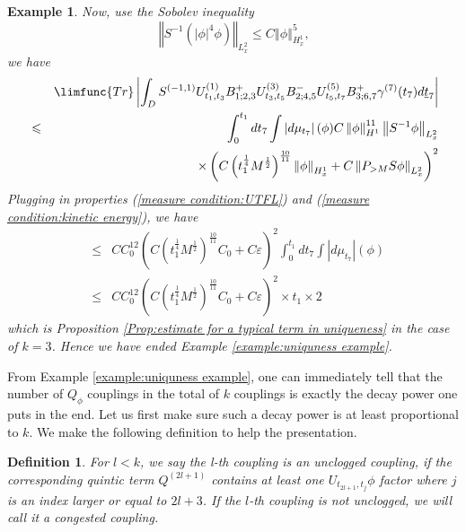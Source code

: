 \documentclass[12pt,letterpaper,leqno]{amsart}
\theoremstyle{plain}
\newtheorem{definition}{Definition}
\newtheorem{example}{Example}
\numberwithin{equation}{section}
\numberwithin{theorem}{section}
\numberwithin{proposition}{section}
\numberwithin{lemma}{section}
\numberwithin{corollary}{section}
\begin{document}
\begin{example}
Now, use the Sobolev inequality%
\begin{equation}
\left\Vert S^{-1}\left( \left\vert \phi \right\vert ^{4}\phi \right)
\right\Vert _{L_{x}^{2}}\leqslant C\left\Vert \phi \right\Vert
_{H_{x}^{1}}^{5}\text{,}  \label{eqn:sobolev for naked term}
\end{equation}%
we have%
\begin{eqnarray*}
&&\limfunc{Tr}\left\vert
\int_{D}S^{(-1,1)}U_{t_{1},t_{3}}^{(1)}B_{1;2,3}^{+}U_{t_{3},t_{5}}^{(3)}B_{2;4,5}^{-}U_{t_{5},t_{7}}^{(5)}B_{3;6,7}^{+}\gamma ^{(7)}(t_{7})d%
\underline{t}_{7}\right\vert \\
&\leqslant &\int_{0}^{t_{1}}dt_{7}\int \left\vert d\mu _{t_{7}}\right\vert
(\phi )C\left\Vert \phi \right\Vert _{H^{1}}^{11}\left\Vert S^{-1}\phi
\right\Vert _{L_{x}^{2}} \\
&&\times \left( C\left( t_{1}^{\frac{1}{4}}M^{\frac{1}{2}}\right) ^{\frac{10%
}{11}}\left\Vert \phi \right\Vert _{H_{x}^{1}}+C\left\Vert P_{>M}S\phi
\right\Vert _{L_{x}^{2}}\right) ^{2}
\end{eqnarray*}%
Plugging in properties (\ref{measure condition:UTFL}) and (\ref{measure
condition:kinetic energy}), we have%
\begin{eqnarray*}
&\leqslant &CC_{0}^{12}\left( C\left( t_{1}^{\frac{1}{4}}M^{\frac{1}{2}%
}\right) ^{\frac{10}{11}}C_{0}+C\varepsilon \right)
^{2}\int_{0}^{t_{1}}dt_{7}\int \left\vert d\mu _{t_{7}}\right\vert (\phi ) \\
&\leqslant &CC_{0}^{12}\left( C\left( t_{1}^{\frac{1}{4}}M^{\frac{1}{2}%
}\right) ^{\frac{10}{11}}C_{0}+C\varepsilon \right) ^{2}\times t_{1}\times 2
\end{eqnarray*}%
which is Proposition \ref{Prop:estimate for a typical term in uniqueness} in
the case of $k=3$. Hence we have ended Example \ref{example:uniquness
example}.
\end{example}

From Example \ref{example:uniquness example}, one can immediately tell that
the number of $Q_{\phi }$ couplings in the total of $k$ couplings is exactly
the decay power one puts in the end. Let us first make sure such a decay
power is at least proportional to $k$. We make the following definition to
help the presentation.

\begin{definition}
\label{def:type of coupling}For $l<k$, we say the l-th coupling is an
unclogged coupling, if the corresponding quintic term $Q^{(2l+1)}$ contains
at least one $U_{t_{2l+1},t_{j}}\phi $ factor where $j$ is an index larger
or equal to $2l+3$. If the $l$-th coupling is not unclogged, we will call it
a congested coupling.
\end{definition}
\end{document}
